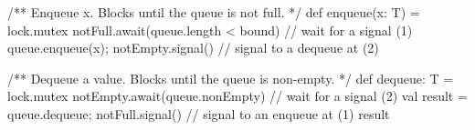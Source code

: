 
\begin{slide}

\begin{scala}
  /** Enqueue x.  Blocks until the queue is not full. */
  def enqueue(x: T) = lock.mutex{
    notFull.await(queue.length < bound)           // wait for a signal (1)
    queue.enqueue(x); notEmpty.signal()           // signal to a dequeue at (2)
  }

  /** Dequeue a value.  Blocks until the queue is non-empty. */
  def dequeue: T = lock.mutex{
    notEmpty.await(queue.nonEmpty)               // wait for a signal (2)
    val result = queue.dequeue; notFull.signal()  // signal to an enqueue at (1)
    result
  }
\end{scala}
\end{slide}


